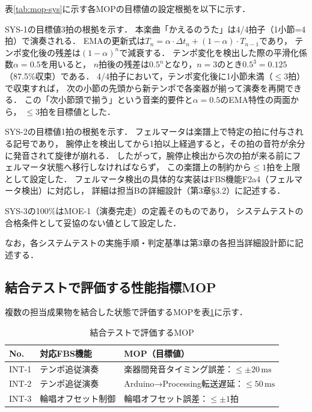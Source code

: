 表\ref{tab:mop-sys}に示す各MOPの目標値の設定根拠を以下に示す．

SYS-1の目標値3拍の根拠を示す．
本楽曲「かえるのうた」は4/4拍子（1小節=4拍）で演奏される．
EMAの更新式は$T_n = \alpha \cdot \Delta t_n + (1-\alpha)\cdot T_{n-1}$であり，
テンポ変化後の残差は$(1-\alpha)^n$で減衰する．
テンポ変化を検出した際の平滑化係数$\alpha=0.5$を用いると，
$n$拍後の残差は$0.5^n$となり，$n=3$のとき$0.5^3=0.125$（87.5\%収束）である．
4/4拍子において，テンポ変化後に1小節未満（$\leq 3$拍）で収束すれば，
次の小節の先頭から新テンポで各楽器が揃って演奏を再開できる．
この「次小節頭で揃う」という音楽的要件と$\alpha=0.5$のEMA特性の両面から，
$\leq 3$拍を目標値とした．

SYS-2の目標値1拍の根拠を示す．
フェルマータは楽譜上で特定の拍に付与される記号であり，
腕停止を検出してから1拍以上経過すると，その拍の音符が余分に発音されて旋律が崩れる．
したがって，腕停止検出から次の拍が来る前にフェルマータ状態へ移行しなければならず，
この楽譜上の制約から$\leq 1$拍を上限として設定した．
フェルマータ検出の具体的な実装はFBS機能F2a4（フェルマータ検出）に対応し，
詳細は担当Bの詳細設計（第3章§3.2）に記述する．

SYS-3の100\%はMOE-1（演奏完走）の定義そのものであり，
システムテストの合格条件として妥協のない値として設定した．

なお，各システムテストの実施手順・判定基準は第3章の各担当詳細設計節に記述する．

\subsection{結合テストで評価する性能指標MOP}

複数の担当成果物を結合した状態で評価するMOPを表\ref{tab:mop-int}に示す．

\begin{table}[H]
  \centering
  \caption{結合テストで評価するMOP}
  \label{tab:mop-int}
  \begin{tabularx}{\linewidth}{llX}
    \toprule
    No. & 対応FBS機能 & MOP（目標値） \\
    \midrule
    INT-1 & テンポ追従演奏 &
      楽器間発音タイミング誤差：$\leq \pm 20\,\mathrm{ms}$ \\
    INT-2 & テンポ追従演奏 &
      Arduino→Processing転送遅延：$\leq 50\,\mathrm{ms}$ \\
    INT-3 & 輪唱オフセット制御 &
      輪唱オフセット誤差：$\leq \pm 1$拍 \\
    \bottomrule
  \end{tabularx}
\end{table}

